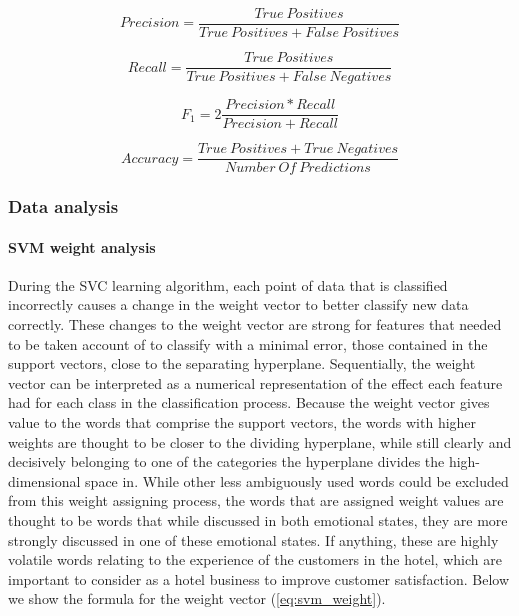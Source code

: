 \documentclass[review]{elsarticle}
\newcommand{\myparagraph}[1]{\paragraph{#1}\mbox{}\smallskip}
\begin{document}
\begin{equation}\label{eq:precision}
Precision = \frac{True \: Positives}{True \: Positives + False \: Positives}
\end{equation}

\begin{equation}\label{eq:recall}
Recall = \frac{True \: Positives}{True \: Positives + False \: Negatives}
\end{equation}

\begin{equation}\label{eq:f1}
F_{1} = 2  \frac{Precision * Recall}{Precision + Recall}
\end{equation}

\begin{equation}\label{eq:accuracy}
Accuracy = \frac{True \: Positives + True \: Negatives}{Number \: Of \: Predictions}
\end{equation}

\subsubsection{Data analysis}\label{dataanalysis}

\myparagraph{SVM weight analysis}\label{svmweightsanalysis} 

During the SVC learning algorithm, each point of data that is classified incorrectly causes a change in the weight vector to better classify new data correctly. These changes to the weight vector are strong for features that needed to be taken account of to classify with a minimal error, those contained in the support vectors, close to the separating hyperplane. Sequentially, the weight vector can be interpreted as a numerical representation of the effect each feature had for each class in the classification process. Because the weight vector gives value to the words that comprise the support vectors, the words with higher weights are thought to be closer to the dividing hyperplane, while still clearly and decisively belonging to one of the categories the hyperplane divides the high-dimensional space in. While other less ambiguously used words could be excluded from this weight assigning process, the words that are assigned weight values are thought to be words that while discussed in both emotional states, they are more strongly discussed in one of these emotional states. If anything, these are highly volatile words relating to the experience of the customers in the hotel, which are important to consider as a hotel business to improve customer satisfaction. Below we show the formula for the weight vector (\ref{eq:svm_weight}).
\end{document}
